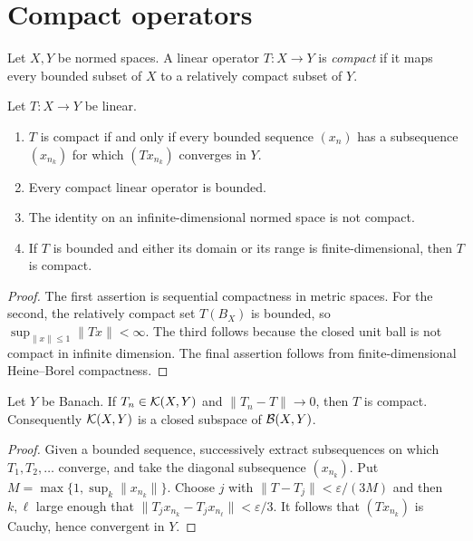 \section{Compact operators}

\begin{notedefinition}
Let $X,Y$ be normed spaces.  A linear operator $T\colon X\to Y$ is
\emph{compact} if it maps every bounded subset of $X$ to a relatively compact
subset of $Y$.
\end{notedefinition}

\begin{notetheorem}
Let $T\colon X\to Y$ be linear.
\begin{enumerate}
  \item $T$ is compact if and only if every bounded sequence $(x_n)$ has a
        subsequence $(x_{n_k})$ for which $(Tx_{n_k})$ converges in $Y$.
  \item Every compact linear operator is bounded.
  \item The identity on an infinite-dimensional normed space is not compact.
  \item If $T$ is bounded and either its domain or its range is
        finite-dimensional, then $T$ is compact.
\end{enumerate}
\end{notetheorem}

\begin{proof}
The first assertion is sequential compactness in metric spaces.  For the
second, the relatively compact set $T(B_X)$ is bounded, so
$\sup_{\|x\|\le1}\|Tx\|<\infty$.  The third follows because the closed unit
ball is not compact in infinite dimension.  The final assertion follows from
finite-dimensional Heine--Borel compactness.
\end{proof}

\begin{notetheorem}
Let $Y$ be Banach.  If $T_n\in\mathcal{K}(X,Y)$ and $\|T_n-T\|\to0$, then $T$ is
compact.  Consequently $\mathcal{K}(X,Y)$ is a closed subspace of
$\mathcal{B}(X,Y)$.
\end{notetheorem}

\begin{proof}
Given a bounded sequence, successively extract subsequences on which
$T_1,T_2,\ldots$ converge, and take the diagonal subsequence $(x_{n_k})$.
Put $M=\max\{1,\sup_k\|x_{n_k}\|\}$.  Choose $j$ with
$\|T-T_j\|<\varepsilon/(3M)$ and then $k,\ell$ large enough that
$\|T_jx_{n_k}-T_jx_{n_\ell}\|<\varepsilon/3$.  It follows that
$(Tx_{n_k})$ is Cauchy, hence convergent in $Y$.
\end{proof}


